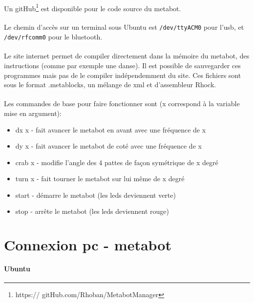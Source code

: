 \documentclass[10pt,a4paper]{report}
\begin{document}
\paragraph{}
Un  gitHub\footnote{https:// gitHub.com/Rhoban/MetabotManager} est disponible pour le code source du metabot.
\paragraph{}
Le chemin d'accès sur un terminal sous Ubuntu est \texttt{/dev/ttyACM0} pour l'usb, et \texttt{/dev/rfcomm0} pour le bluetooth. 

\paragraph{}
Le site internet permet de compiler directement dans la mémoire du metabot, des instructions (comme par exemple une danse). Il est possible de sauvegarder ces programmes mais pas de le compiler indépendemment du site. Ces fichiers sont sous le format .metablocks, un mélange de xml et d'assembleur Rhock.
\paragraph{}
Les commandes de base pour faire fonctionner sont (x correspond à la variable mise en argument):\\
\begin{itemize}
\item dx x - fait avancer le metabot en avant avec une fréquence de x
\item dy x - fait avancer le metabot de coté avec une fréquence de x
\item crab x - modifie l'angle des 4 pattes de façon symétrique de x degré
\item turn x - fait tourner le metabot sur lui même de x degré
\item start - démarre le metabot (les  leds deviennent verte)
\item stop - arrête le metabot (les  leds deviennent rouge)
\end{itemize}

\section{Connexion pc - metabot}

\paragraph{Ubuntu}
\end{document}
